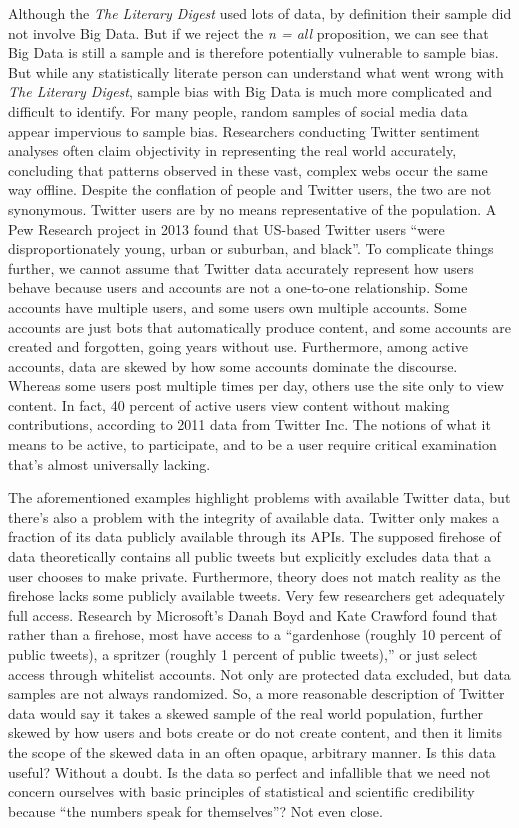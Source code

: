\documentclass[sigconf]{acmart}
\begin{document}
Although the {\em The Literary Digest} used lots of data, by definition their sample did not involve Big Data\cite{Lagoze2014}. But if we reject the {\em n = all} proposition, we can see that Big Data is still a sample and is therefore potentially vulnerable to sample bias. But while any statistically literate person can understand what went wrong with {\em The Literary Digest}, sample bias with Big Data is much more complicated and difficult to identify. For many people, random samples of social media data appear impervious to sample bias. Researchers conducting Twitter sentiment analyses often claim objectivity in representing the real world accurately, concluding that patterns observed in these vast, complex webs occur the same way offline. Despite the conflation of people and Twitter users, the two are not synonymous. Twitter users are by no means representative of the population. A Pew Research project in 2013 found that US-based Twitter users ``were disproportionately young, urban or suburban, and black''\cite{Boyd-Crawford2011}. To complicate things further, we cannot assume that Twitter data accurately represent how users behave because users and accounts are not a one-to-one relationship. Some accounts have multiple users, and some users own multiple accounts. Some accounts are just bots that automatically produce content, and some accounts are created and forgotten, going years without use. Furthermore, among active accounts, data are skewed by how some accounts dominate the discourse. Whereas some users post multiple times per day, others use the site only to view content. In fact, 40 percent of active users view content without making contributions, according to 2011 data from Twitter Inc\cite{Boyd-Crawford2011}. The notions of what it means to be active, to participate, and to be a user require critical examination that's almost universally lacking.

The aforementioned examples highlight problems with available Twitter data, but there's also a problem with the integrity of available data. Twitter only makes a fraction of its data publicly available through its APIs. The supposed firehose of data theoretically contains all public tweets but explicitly excludes data that a user chooses to make private. Furthermore, theory does not match reality as the firehose lacks some publicly available tweets. Very few researchers get adequately full access. Research by Microsoft's Danah Boyd and Kate Crawford found that rather than a firehose, most have access to a ``gardenhose (roughly 10 percent of public tweets), a spritzer (roughly 1 percent of public tweets),'' or just select access through whitelist accounts\cite{Boyd-Crawford2011}. Not only are protected data excluded, but data samples are not always randomized. So, a more reasonable description of Twitter data would say it takes a skewed sample of the real world population, further skewed by how users and bots create or do not create content, and then it limits the scope of the skewed data in an often opaque, arbitrary manner\cite{Boyd-Crawford2011}. Is this data useful? Without a doubt. Is the data so perfect and infallible that we need not concern ourselves with basic principles of statistical and scientific credibility because ``the numbers speak for themselves''\cite{Anderson2008}? Not even close.
\end{document}
